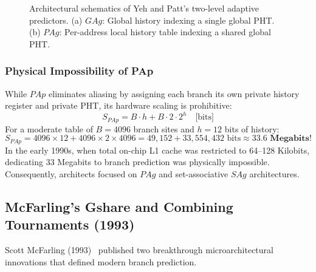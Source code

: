 \documentclass[11pt,a4paper]{article}
\begin{document}
\begin{figure}[htbp]
{
}
\caption{Architectural schematics of Yeh and Patt's two-level adaptive predictors. (a) $GAg$: Global history indexing a single global PHT. (b) $PAg$: Per-address local history table indexing a shared global PHT.}
\label{fig:two_level_taxonomy}
\end{figure}

\subsubsection{Physical Impossibility of PAp}
While $PAp$ eliminates aliasing by assigning each branch its own private history register and private PHT, its hardware scaling is prohibitive:
\begin{equation}
    S_{PAp} = B \cdot h + B \cdot 2 \cdot 2^h \quad \text{[bits]}
\end{equation}
For a moderate table of $B = 4096$ branch sites and $h = 12$ bits of history:
\begin{equation}
    S_{PAp} = 4096 \times 12 + 4096 \times 2 \times 4096 = 49,152 + 33,554,432 \text{ bits} \approx \mathbf{33.6\text{ Megabits!}}
\end{equation}
In the early 1990s, when total on-chip L1 cache was restricted to 64--128 Kilobits, dedicating 33 Megabits to branch prediction was physically impossible. Consequently, architects focused on $PAg$ and set-associative $SAg$ architectures.

\subsection{McFarling's Gshare and Combining Tournaments (1993)}
\label{sec:mcfarling}
Scott McFarling (1993)~\cite{mcfarling1993} published two breakthrough microarchitectural innovations that defined modern branch prediction.
\end{document}
